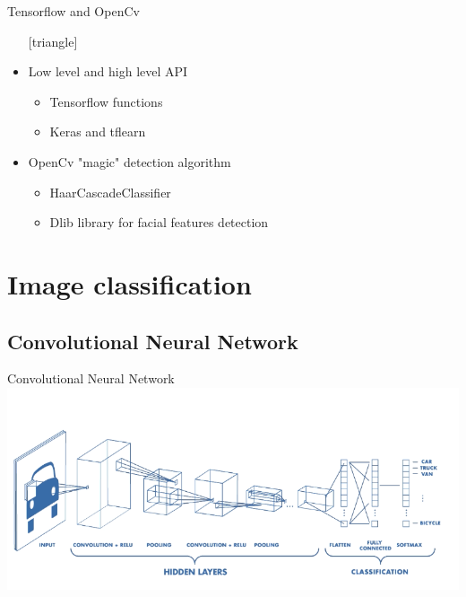 \documentclass{beamer}
\begin{document}
\begin{frame}{Tensorflow and OpenCv}
	\begin{itemize}
		\setlength\itemsep{1em}
		[triangle]
		\item 
			Low level and high level API
			\begin{itemize}
				[circle]
				\item 
					Tensorflow functions
				\item 
					Keras and tflearn
			\end{itemize}
		\item 
			OpenCv "magic" detection algorithm
			\begin{itemize}
				[circle]
				\item 
					HaarCascadeClassifier
				\item 
					Dlib library for facial features detection
			\end{itemize}
	\end{itemize}
\end{frame}



\section{Image classification}

\subsection{Convolutional Neural Network}

\begin{frame}{Convolutional Neural Network}
	\includegraphics[scale=0.45]{CNN}
\end{frame}
\end{document}
